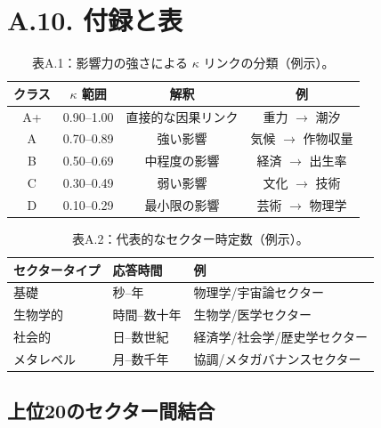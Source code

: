 \documentclass[13pt,a4paper]{ltjsarticle}
\begin{document}
	\section*{A.10. 付録と表}
	
	\begin{table}[htbp]
		\centering
		\small
		\begin{tabular}{cccc}
			\toprule
			\textbf{クラス} & \textbf{$\kappa$ 範囲} & \textbf{解釈} & \textbf{例} \\
			\midrule
			A+ & 0.90--1.00 & 直接的な因果リンク & 重力 $\rightarrow$ 潮汐 \\
			A  & 0.70--0.89 & 強い影響 & 気候 $\rightarrow$ 作物収量 \\
			B  & 0.50--0.69 & 中程度の影響 & 経済 $\rightarrow$ 出生率 \\
			C  & 0.30--0.49 & 弱い影響 & 文化 $\rightarrow$ 技術 \\
			D  & 0.10--0.29 & 最小限の影響 & 芸術 $\rightarrow$ 物理学 \\
			\bottomrule
		\end{tabular}
		\caption{表A.1：影響力の強さによる $\kappa$ リンクの分類（例示）。}
	\end{table}
	
	\begin{table}[htbp]
		\centering
		\small
		\begin{tabular}{p{}p{}p{}}
			\toprule
			\textbf{セクタータイプ} & \textbf{応答時間} & \textbf{例} \\
			\midrule
			基礎 & 秒--年 & 物理学/宇宙論セクター \\
			生物学的  & 時間--数十年 & 生物学/医学セクター \\
			社会的      & 日--数世紀 & 経済学/社会学/歴史学セクター \\
			メタレベル  & 月--数千年 & 協調/メタガバナンスセクター \\
			\bottomrule
		\end{tabular}
		\caption{表A.2：代表的なセクター時定数（例示）。}
	\end{table}
	
	\subsection*{上位20のセクター間結合}
	
\end{document}
